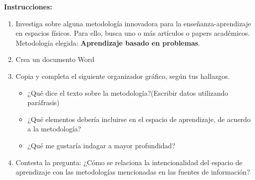 





\textbf{Instrucciones:}
\begin{enumerate}
    \item Investiga sobre alguna metodología innovadora para la enseñanza-aprendizaje en espacios físicos. Para ello, busca uno o más artículos o papers académicos. Metodología elegida: \textbf{Aprendizaje basado en problemas}.
    
    \item Crea un documento Word
    
    \item Copia y completa el siguiente organizador gráfico, según tus hallazgos.
    \begin{itemize}
        \item ¿Qué dice el texto sobre la metodología?(Escribir datos utilizando
        paráfrasis)
        \begin{sol}
        \end{sol}
        
        \item ¿Qué elementos  debería incluirse en el  espacio de  aprendizaje, de  acuerdo a la metodología?	
        \begin{sol}
        \end{sol}
        
        \item ¿Qué me gustaría  indagar a mayor  profundidad?
        \begin{sol}
        \end{sol}
    \end{itemize}
    
    
    \item Contesta la pregunta: ¿Cómo se relaciona la intencionalidad del espacio de aprendizaje con las metodologías mencionadas en las fuentes de información? 
\end{enumerate}
%
%

